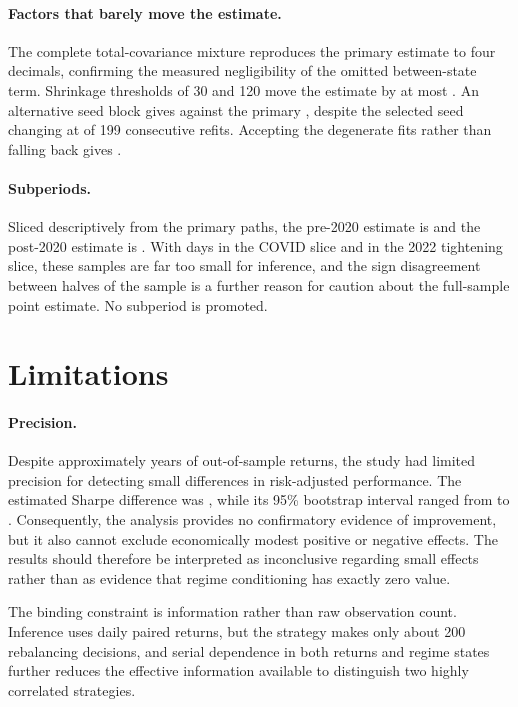 \paragraph{Factors that barely move the estimate.} The complete
total-covariance mixture reproduces the primary estimate to four
decimals, confirming the measured negligibility of the omitted
between-state term. Shrinkage thresholds of 30 and 120 move the estimate
by at most \kappaMaxMove{}. An alternative seed block gives
\altSeedsDiff{} against the primary \primarySharpeDiff{}, despite the
selected seed changing at  of 199 consecutive refits.
Accepting the degenerate fits rather than falling back gives
\aTwoAcceptDiff{}.

\paragraph{Subperiods.} Sliced descriptively from the primary paths, the
pre-2020 estimate is \preTwentyTwentyDiff{} and the post-2020 estimate is
\postTwentyTwentyDiff{}. With \covidDays{} days in the COVID slice and
\tighteningDays{} in the 2022 tightening slice,
these samples are far too small for inference, and the sign disagreement
between halves of the sample is a further reason for caution about the
full-sample point estimate. No subperiod is promoted.



\section{Limitations}
\label{sec:limitations}

\paragraph{Precision.} Despite approximately \oosYears{} years of out-of-sample
returns, the study had limited precision for detecting small differences
in risk-adjusted performance. The estimated Sharpe difference was
\primarySharpeDiff{}, while its 95\% bootstrap interval ranged from
\primaryCiLower{} to \primaryCiUpper{}. Consequently, the analysis
provides no confirmatory evidence of improvement, but it also cannot
exclude economically modest positive or negative effects. The results
should therefore be interpreted as inconclusive regarding small effects
rather than as evidence that regime conditioning has exactly zero value.

The binding constraint is information rather than raw observation count.
Inference uses daily paired returns, but the strategy makes only about
200 rebalancing decisions, and serial dependence in both returns and
regime states further reduces the effective information available to
distinguish two highly correlated strategies.

